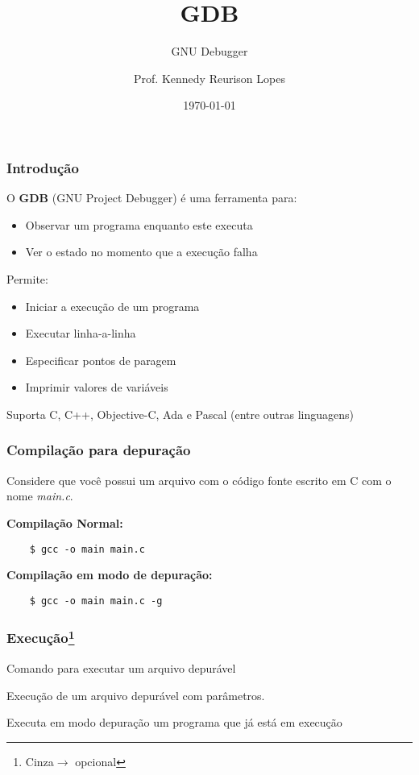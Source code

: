 \documentclass[12pt]{beamer}
\title{GDB}
\subtitle{GNU Debugger}
\author{Prof. Kennedy Reurison Lopes}
\date{\today}
\newcommand{\codigoEDescricao}[2]{%
  \begin{tcolorbox}[colback=gray!10,colframe=caixa,title=\textbf{\textcolor{codigo}{#1}}] %
  \par
  #2
  \end{tcolorbox}%
}
\begin{document}
\frame{\titlepage}

\begin{frame}[t]
    \frametitle{Introdução}
    O \textbf{GDB} (GNU Project Debugger) é uma ferramenta para:\vfill
    \begin{itemize}
        \item Observar um programa enquanto este executa
        \item Ver o estado no momento que a execução falha
    \end{itemize}
    \vfill Permite:
    \begin{itemize}
        \item Iniciar a execução de um programa
        \item Executar linha-a-linha
        \item Especificar pontos de paragem
        \item Imprimir valores de variáveis
    \end{itemize}\vfill
    Suporta C, C++, Objective-C, Ada e Pascal (entre outras linguagens)
\end{frame}

\begin{frame}[fragile]
    \frametitle{Compilação para depuração}

    Considere que você possui um arquivo com o código fonte escrito em C com o nome \emph{main.c}.\vfill

    \textbf{Compilação Normal:}

    \begin{lstlisting}
    $ gcc -o main main.c
    \end{lstlisting}


    \textbf{Compilação em modo de depuração:}

    \begin{lstlisting}
    $ gcc -o main main.c -g
    \end{lstlisting}

\end{frame}

\newcommand{\mm}{\texttt{--}}
\begin{frame}[fragile,t]
    \frametitle{Execução\footnote{Cinza$\rightarrow$ opcional}}

    \codigoEDescricao{\$ gdb main \textcolor{opt}{core dump}}
    {Comando para executar um arquivo depurável}

    \codigoEDescricao{\$ gdb \mm args \underline{program} \underline{args\ldots}}
    {Execução de um arquivo depurável com parâmetros.}

    \codigoEDescricao{\$ gdb \mm pid \underline{pid}}{Executa em modo depuração um programa que já está em execução}
\end{frame}
\end{document}
